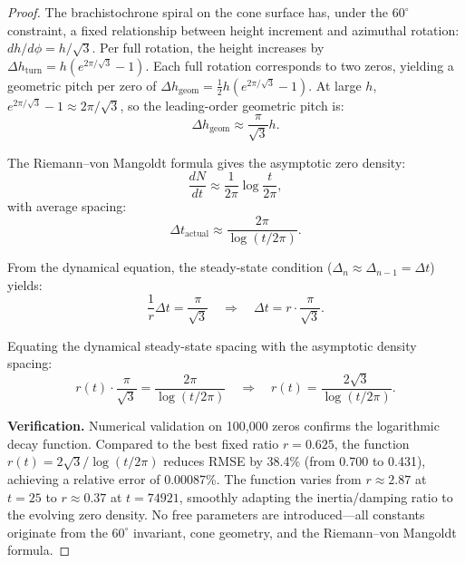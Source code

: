 \documentclass[12pt,a4paper]{article}
\begin{document}
\begin{proof}
The brachistochrone spiral on the cone surface has, under the $60^\circ$ constraint, a fixed relationship between height increment and azimuthal rotation: $dh/d\phi = h/\sqrt{3}$. Per full rotation, the height increases by $\Delta h_{\text{turn}} = h(e^{2\pi/\sqrt{3}}-1)$. Each full rotation corresponds to two zeros, yielding a geometric pitch per zero of $\Delta h_{\text{geom}} = \frac{1}{2}h(e^{2\pi/\sqrt{3}}-1)$. At large $h$, $e^{2\pi/\sqrt{3}}-1 \approx 2\pi/\sqrt{3}$, so the leading-order geometric pitch is:
\begin{equation}
\Delta h_{\text{geom}} \approx \frac{\pi}{\sqrt{3}} h.
\end{equation}

The Riemann--von Mangoldt formula gives the asymptotic zero density:
\begin{equation}
\frac{dN}{dt} \approx \frac{1}{2\pi}\log\frac{t}{2\pi},
\end{equation}
with average spacing:
\begin{equation}
\Delta t_{\text{actual}} \approx \frac{2\pi}{\log(t/2\pi)}.
\end{equation}

From the dynamical equation, the steady-state condition ($\Delta_n \approx \Delta_{n-1} = \Delta t$) yields:
\begin{equation}
\frac{1}{r}\Delta t = \frac{\pi}{\sqrt{3}} \quad \Longrightarrow \quad \Delta t = r \cdot \frac{\pi}{\sqrt{3}}.
\end{equation}

Equating the dynamical steady-state spacing with the asymptotic density spacing:
\begin{equation}
r(t) \cdot \frac{\pi}{\sqrt{3}} = \frac{2\pi}{\log(t/2\pi)} \quad \Longrightarrow \quad r(t) = \frac{2\sqrt{3}}{\log(t/2\pi)}.
\end{equation}

\textbf{Verification.} Numerical validation on 100,000 zeros confirms the logarithmic decay function. Compared to the best fixed ratio $r=0.625$, the function $r(t) = 2\sqrt{3}/\log(t/2\pi)$ reduces RMSE by 38.4\% (from 0.700 to 0.431), achieving a relative error of 0.00087\%. The function varies from $r \approx 2.87$ at $t=25$ to $r \approx 0.37$ at $t=74921$, smoothly adapting the inertia/damping ratio to the evolving zero density. No free parameters are introduced---all constants originate from the $60^\circ$ invariant, cone geometry, and the Riemann--von Mangoldt formula.
\end{proof}
\end{document}
